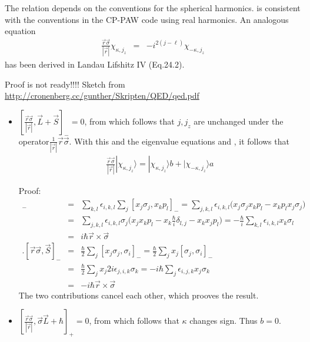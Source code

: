 \documentclass[11pt,a4paper]{report}
\begin{document}
The relation depends on the conventions for the spherical harmonics.
 is consistent with the conventions
in the CP-PAW code using real harmonics. An analogous equation
\begin{eqnarray}
\frac{\vec{r}\vec{\sigma}}{|\vec{r}|}\chi_{\kappa,j_z}
&=&-i^{2(j-\ell)}\chi_{-\kappa,j_z}
\end{eqnarray}
has been derived in Landau Lifshitz IV (Eq.24.2). 


Proof is not ready!!!! Sketch from
\url{http://cronenberg.cc/gunther/Skripten/QED/qed.pdf}

\begin{itemize}
\item $[\frac{\vec{r}\vec{\sigma}}{|\vec{r}|},\vec{L}+\vec{S}]_-=0$,
  from which follows that $j,j_z$ are unchanged under the operator$
  \frac{1}{|\vec{r}|}\vec{r}\vec{\sigma}$. With this and the eigenvalue
  equations  and
  , it follows that
\begin{eqnarray}
\frac{\vec{r}\vec{\sigma}}{|\vec{r}|}|\chi_{\kappa,j_z}\rangle=
  |\chi_{\kappa,j_z}\rangle b+|\chi_{-\kappa,j_z}\rangle a
\label{eq:smallcompidentityexp1}
\end{eqnarray}

Proof:
\begin{eqnarray*}
[\vec{r}\vec{\sigma},\vec{L}]_-
&=&\sum_{k,l}\epsilon_{i,k,l}\sum_j [x_j\sigma_j,x_kp_l]_-
%
=\sum_{j,k,l}\epsilon_{i,k,l}\biggl(x_j\sigma_jx_kp_l-x_kp_lx_j\sigma_j\biggr)
\\
&=&\sum_{j,k,l}\epsilon_{i,k,l}\sigma_j\biggl(x_jx_kp_l
-x_k\frac{\hbar}{i}\delta_{l,j}-x_kx_jp_l\biggr)
=-\frac{\hbar}{i}\sum_{k,l}\epsilon_{i,k,l}x_k\sigma_l
\\
&=&i\hbar\vec{r}\times\vec{\sigma}
\\
.[\vec{r}\vec{\sigma},\vec{S}]_-
&=&\frac{\hbar}{2}\sum_{j} [x_j\sigma_j,\sigma_i]_-
%
=\frac{\hbar}{2}\sum_{j} x_j[\sigma_j,\sigma_i]_-
\\
&=&\frac{\hbar}{2}\sum_{j} x_j2i\epsilon_{j,i,k}\sigma_k
%
=-i\hbar\sum_{j} \epsilon_{i,j,k}x_j\sigma_k
\\
&=&-i\hbar\vec{r}\times\vec{\sigma}
\end{eqnarray*}
The two contributions cancel each other, which prooves the result.
\item
  $[\frac{\vec{r}\vec{\sigma}}{|\vec{r}|},\vec{\sigma}\vec{L}+\hbar]_+=0$,
  from which follows that $\kappa$ changes sign. Thus $b=0$.


\end{itemize}
\end{document}
